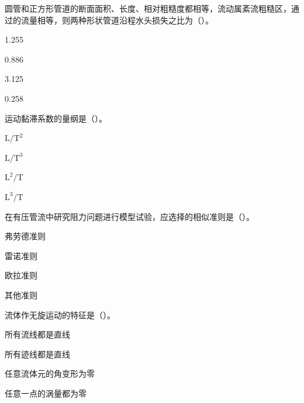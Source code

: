 \begin{ti}
\item 圆管和正方形管道的断面面积、长度、相对粗糙度都相等，流动属紊流粗糙区，通过的流量相等，则两种形状管道沿程水头损失之比为（\quad）。
\begin{choices}
\item 1.255
\item 0.886
\item 3.125
\item 0.258
\end{choices}

\item 运动黏滞系数的量纲是（\quad）。
\begin{choices}
\item $\mathrm{L}/\mathrm{T}^2$
\item $\mathrm{L}/\mathrm{T}^3$
\item $\mathrm{L}^2/\mathrm{T}$
\item $\mathrm{L}^3/\mathrm{T}$
\end{choices}

\item 在有压管流中研究阻力问题进行模型试验，应选择的相似准则是（\quad）。
\begin{choices}
\item 弗劳德准则
\item 雷诺准则
\item 欧拉准则
\item 其他准则
\end{choices}

\item 流体作无旋运动的特征是（\quad）。
\begin{choices}
\item 所有流线都是直线
\item 所有迹线都是直线
\item 任意流体元的角变形为零
\item 任意一点的涡量都为零
\end{choices}


\end{ti}
